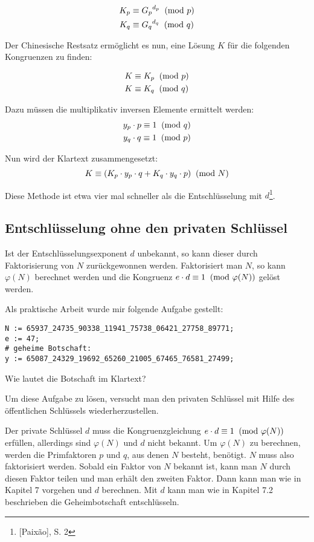 \begin{align*}
K_p &\equiv {G_p} ^ {d_p} \imod{p}\\
K_q &\equiv {G_q} ^ {d_q} \imod{q}
\end{align*}

Der Chinesische Restsatz ermöglicht es nun, eine Lösung $K$ für die 
folgenden Kongruenzen zu finden:

\begin{align*}
K &\equiv K_p \imod{p}\\
K &\equiv K_q \imod{q}
\end{align*}

Dazu müssen die multiplikativ inversen Elemente ermittelt werden:
\begin{align*}
y_p \cdot p \equiv 1 \imod{q}\\
y_q \cdot q \equiv 1 \imod{p}
\end{align*}

Nun wird der Klartext zusammengesetzt:
\[K \equiv (K_p \cdot y_p \cdot q + K_q \cdot y_q \cdot p) \imod{N}\]

Diese Methode ist etwa vier mal schneller als die Entschlüsselung mit $d$\footnote{[Paixão], S. 2}.

\subsection{Entschlüsselung ohne den privaten Schlüssel}
Ist der Entschlüsselungsexponent $d$ unbekannt, so kann dieser durch
Faktorisierung von $N$ zurückgewonnen werden. Faktorisiert man $N$, so 
kann $\varphi(N)$ berechnet werden und die Kongruenz $e \cdot d \equiv 1 \imod{\varphi(N)}$ gelöst werden. 

Als praktische Arbeit wurde mir folgende Aufgabe gestellt:

\begin{mdframed}[tikzsetting={draw=black,very thick}, innertopmargin=0.6cm]
\begin{verbatim}
N := 65937_24735_90338_11941_75738_06421_27758_89771;
e := 47;
# geheime Botschaft:
y := 65087_24329_19692_65260_21005_67465_76581_27499;
\end{verbatim}
Wie lautet die Botschaft im Klartext?
\end{mdframed}

Um diese Aufgabe zu lösen, versucht man den privaten Schlüssel mit 
Hilfe des öffentlichen Schlüssels wiederherzustellen.

Der private Schlüssel $d$ muss die Kongruenzgleichung 
$e \cdot d \equiv 1 \imod{\varphi(N)}$ erfüllen, allerdings sind 
$\varphi(N)$ und $d$ nicht bekannt. Um $\varphi(N)$ zu berechnen, 
werden die Primfaktoren $p$ und $q$, aus denen $N$ besteht, benötigt. 
$N$ muss also faktorisiert werden. Sobald ein Faktor von $N$ bekannt 
ist, kann man $N$ durch diesen Faktor teilen und man erhält den 
zweiten Faktor. Dann kann man wie in Kapitel 7 vorgehen und $d$ %
berechnen. Mit $d$ kann man wie in Kapitel 7.2 beschrieben die  %
Geheimbotschaft entschlüsseln.

